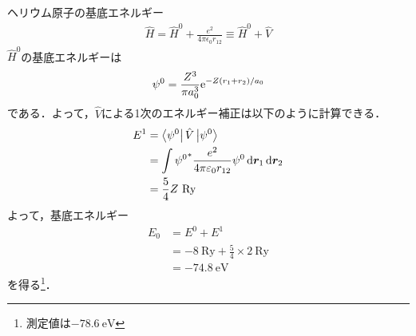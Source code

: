 \documentclass{report}
\begin{document}
  \begin{myex}{ヘリウム原子の基底エネルギー}{}
    \begin{align}
      \hat{H} = \hat{H}^0 + \frac{e^2}{4\pi\epsilon_0r_{12}}\equiv\hat{H}^0 + \hat{V}
    \end{align}
    $\hat{H}^0$の基底エネルギーは
    \begin{align}
      \psi^0 = \frac{Z^3}{\pi a_0^3}\mathrm{e}^{-Z(r_1+r_2)/a_0}
    \end{align}
    である．よって，$\hat{V}$による1次のエネルギー補正は以下のように計算できる．
    \begin{align}
      E^1 &= \bra{\psi^0}\hat{V}\ket{\psi^0}\\
      &= \int{\psi^0}^{*}\frac{e^2}{4\pi\varepsilon_0r_{12}}\psi^0\dd{\bm{r}_1}\dd{\bm{r}_2} \\
      &= \frac{5}{4}Z\ \mathrm{Ry}
    \end{align}
    よって，基底エネルギー
    \begin{align}
      E_0&=E^0+E^1\\
      &= -8\ \mathrm{Ry}+\frac{5}{4}\times{2}\ \mathrm{Ry}\\
      &= -74.8\ \mathrm{eV}
    \end{align}
    を得る\footnote{測定値は$-78.6\ \mathrm{eV}$}．
  \end{myex}
\end{document}
